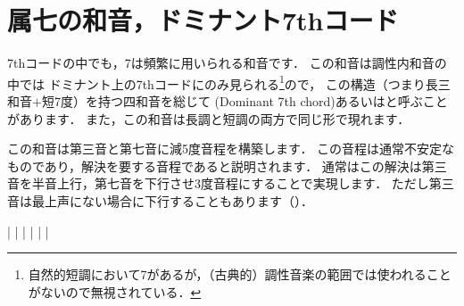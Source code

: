 \documentclass[dvipdfmx,uplatex,b5paper,openany,jbase=12Q,nomag*,textwidth-limit=44%
               ]{gachimuchi}
\begin{document}
\section{属七の和音，ドミナント7thコード}
7thコードの中でも，\Gnv\subsc7は頻繁に用いられる和音です．
この和音は調性内和音の中では%
ドミナント上の7thコードにのみ見られる\footnote{%
  自然的短調において\bFlat\Gnvii\subsc7があるが，（古典的）調性音楽の範囲では使われることがないので無視されている．
}ので，
この構造（つまり長三和音$+$短7度）を持つ四和音を総じて
\xkanjispace(Dominant 7th chord)あるいはと呼ぶことがあります．
また，この和音は長調と短調の両方で同じ形で現れます．

この和音は第三音と第七音に減5度音程を構築します．
この音程は通常不安定なものであり，解決を要する音程であると説明されます．
通常はこの解決は第三音を半音上行，第七音を下行させ3度音程にすることで実現します．
ただし第三音は最上声にない場合に下行することもあります（）．

\begin{floatMusic}[pos=ht,width=0.5\linewidth]
  \Startpiece%
  \Notes%
  |%
  \en\bar%
  \Notes%
  |%
  \en\doublebar%
  \Notes%
  |%
  \en\bar%
  \Notes%
  |%
  \en\setdoublebar
  \endpiece%
\end{floatMusic}
\end{document}
